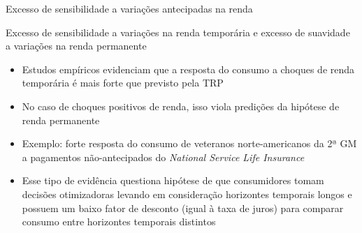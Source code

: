 \documentclass[10pt]{beamer}
\begin{document}
\begin{frame}{Excesso de sensibilidade a variações antecipadas na renda}    
    \begin{figure}
        \centering
         \qquad
    \end{figure}    
\end{frame}

\begin{frame}
    {Excesso de sensibilidade a variações na renda temporária e excesso de suavidade a variações na renda permanente}
    \begin{itemize}
        \item Estudos empíricos evidenciam que a resposta do consumo a choques de renda temporária é mais forte que previsto pela TRP\bigskip
        \item No caso de choques positivos de renda, isso viola predições da hipótese de renda permanente\bigskip
        \item Exemplo: forte resposta do consumo de veteranos norte-americanos da 2ª GM a pagamentos não-antecipados do \emph{National Service Life Insurance}\bigskip
        \item Esse tipo de evidência questiona hipótese de que consumidores tomam decisões otimizadoras levando em consideração horizontes temporais longos e possuem um baixo fator de desconto (igual à taxa de juros) para comparar consumo entre horizontes temporais distintos
    \end{itemize}
\end{frame}
\end{document}
